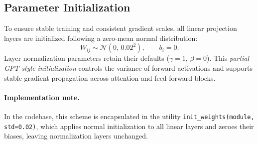 \documentclass[11pt]{article}
\begin{document}
\subsection{Parameter Initialization}

To ensure stable training and consistent gradient scales,
all linear projection layers are initialized following a zero-mean normal distribution:
\[
W_{ij} \sim \mathcal{N}(0,\, 0.02^2),
\qquad
b_i = 0.
\]
Layer normalization parameters retain their defaults
($\gamma=1$, $\beta=0$).
This \emph{partial GPT-style initialization} controls the variance
of forward activations and supports stable gradient propagation
across attention and feed-forward blocks.

\paragraph{Implementation note.}
In the codebase, this scheme is encapsulated in the utility
\texttt{init\_weights(module, std=0.02)},
which applies normal initialization to all linear layers
and zeroes their biases, leaving normalization layers unchanged.
\end{document}

